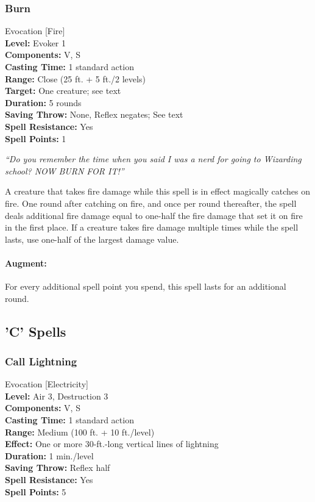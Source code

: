 \subsubsection{Burn}
\label{Spell:Burn}
Evocation [Fire]
\\ \textbf{Level:} Evoker 1
\\ \textbf{Components:} V, S
\\ \textbf{Casting Time:} 1 standard action
\\ \textbf{Range:} Close (25 ft. + 5 ft./2 levels)
\\ \textbf{Target:} One creature; see text
\\ \textbf{Duration:} 5 rounds
\\ \textbf{Saving Throw:} None, Reflex negates; See text
\\ \textbf{Spell Resistance:} Yes
\\ \textbf{Spell Points:} 1

\emph{``Do you remember the time when you said I was a nerd for going to Wizarding school? NOW BURN FOR IT!''}

A creature that takes fire damage while this spell is in effect magically catches on fire.
One round after catching on fire, and once per round thereafter, the spell deals additional fire damage equal to one-half the fire damage that set it on fire in the first place.
If a creature takes fire damage multiple times while the spell lasts, use one-half of the largest damage value.

\paragraph{Augment:} For every additional spell point you spend, this spell lasts for an additional round.
\subsection{'C' Spells}
\subsubsection{Call Lightning}
\label{Spell:CallLightning}
Evocation [Electricity]
\\ \textbf{Level:} Air 3, Destruction 3
\\ \textbf{Components:} V, S
\\ \textbf{Casting Time:} 1 standard action
\\ \textbf{Range:} Medium (100 ft. + 10 ft./level)
\\ \textbf{Effect:} One or more 30-ft.-long vertical lines of lightning
\\ \textbf{Duration:} 1 min./level
\\ \textbf{Saving Throw:} Reflex half
\\ \textbf{Spell Resistance:} Yes
\\ \textbf{Spell Points:} 5

